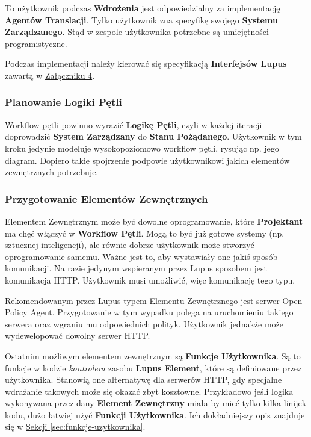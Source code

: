 To użytkownik podczas \textbf{Wdrożenia} jest odpowiedzialny za implementację \textbf{Agentów Translacji}. Tylko użytkownik zna specyfikę swojego \textbf{Systemu Zarządzanego}. Stąd w zespole użytkownika potrzebne są umiejętności programistyczne. 

Podczas implementacji należy kierować się specyfikacją \textbf{Interfejsów Lupus} zawartą w \hyperref[appendix:4]{Załączniku 4}.

\subsubsection{Planowanie Logiki Pętli}

Workflow pętli powinno wyrazić \textbf{Logikę Pętli}, czyli w każdej iteracji doprowadzić \textbf{System Zarządzany} do \textbf{Stanu Pożądanego}. Użytkownik w tym kroku jedynie modeluje wysokopoziomowo workflow pętli, rysując np. jego diagram. Dopiero takie spojrzenie podpowie użytkownikowi jakich elementów zewnętrznych potrzebuje.

\subsubsection{Przygotowanie Elementów Zewnętrznych}

Elementem Zewnętrznym może być dowolne oprogramowanie, które \textbf{Projektant} ma chęć włączyć w \textbf{Workflow Pętli}. Mogą to być już gotowe systemy (np. sztucznej inteligencji), ale równie dobrze użytkownik może stworzyć oprogramowanie samemu. Ważne jest to, aby wystawiały one jakiś sposób komunikacji. Na razie jedynym wspieranym przez Lupus sposobem jest komunikacja HTTP. Użytkownik musi umożliwić, więc komunikację tego typu.

Rekomendowanym przez Lupus typem Elementu Zewnętrznego jest serwer Open Policy Agent. Przygotowanie w tym wypadku polega na uruchomieniu takiego serwera oraz wgraniu mu odpowiednich polityk. Użytkownik jednakże może wydewelopować dowolny serwer HTTP.

Ostatnim możliwym elementem zewnętrznym są \textbf{Funkcje Użytkownika}. Są to funkcje w kodzie \textit{kontrolera} zasobu \textbf{Lupus Element}, które są definiowane przez użytkownika. Stanowią one alternatywę dla serwerów HTTP, gdy specjalne wdrażanie takowych może się okazać zbyt kosztowne. Przykładowo jeśli logika wykonywana przez dany \textbf{Element Zewnętrzny} miała by mieć tylko kilka linijek kodu, dużo łatwiej użyć \textbf{Funkcji Użytkownika}. Ich dokładniejszy opis znajduje się w \hyperref[sec:funkcje-uzytkownika]{Sekcji \ref{sec:funkcje-uzytkownika}}.


